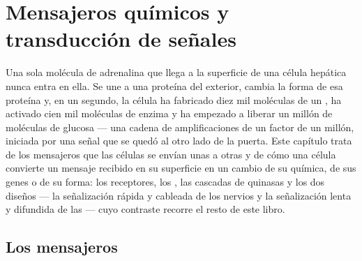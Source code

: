 \chapter{Mensajeros químicos y transducción de señales}\label{ch:b2:cell-signalling}

Una sola molécula de adrenalina que llega a la superficie de una célula
hepática nunca entra en ella. Se une a una proteína del exterior, cambia
la forma de esa proteína y, en un segundo, la célula ha fabricado diez
mil moléculas de un , ha activado cien mil moléculas de
enzima y ha empezado a liberar un millón de moléculas de glucosa --- una
cadena de amplificaciones de un factor de un millón, iniciada por una
señal que se quedó al otro lado de la puerta. Este capítulo trata de los
mensajeros que las células se envían unas a otras y de cómo una célula
convierte un mensaje recibido en su superficie en un cambio de su
química, de sus genes o de su forma: los receptores, los , las cascadas de quinasas y los dos diseños --- la señalización
rápida y cableada de los nervios y la señalización lenta y difundida de
las  --- cuyo contraste recorre el resto de este libro.

\section{Los mensajeros}

